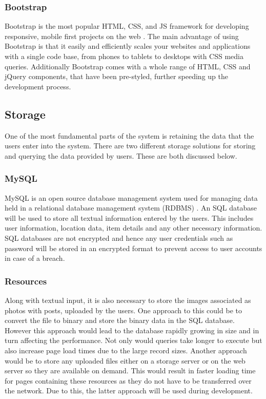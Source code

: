 \subsubsection{Bootstrap} 
Bootstrap is the most popular HTML, CSS, and JS framework for developing responsive, mobile first projects on the web \cite{Bootstrap:Home}. The main advantage of using Bootstrap is that it easily and efficiently scales your websites and applications with a single code base, from phones to tablets to desktops with CSS media queries. Additionally Bootstrap comes with a whole range of HTML, CSS and jQuery components, that have been pre-styled, further speeding up the development process.

\subsection{Storage}
One of the most fundamental parts of the system is retaining the data that the users enter into the system. There are two different storage solutions for storing and querying the data provided by users. These are both discussed below.

\subsubsection{MySQL} 
MySQL is an open source database management system used for managing data held in a relational database management system (RDBMS) \cite{MySQL:Home}. An SQL database will be used to store all textual information entered by the users. This includes user information, location data, item details and any other necessary information. SQL databases are not encrypted and hence any user credentials such as password will be stored in an encrypted format to prevent access to user accounts in case of a breach.

\subsubsection{Resources}
Along with textual input, it is also necessary to store the images associated as photos with posts, uploaded by the users. One approach to this could be to convert the file to binary and store the binary data in the SQL database. However this approach would lead to the database rapidly growing in size and in turn affecting the performance. Not only would queries take longer to execute but also increase page load times due to the large record sizes. Another approach would be to store any uploaded files either on a storage server or on the web server so they are available on demand. This would result in faster loading time for pages containing these resources as they do not have to be transferred over the network. Due to this, the latter approach will be used during development.